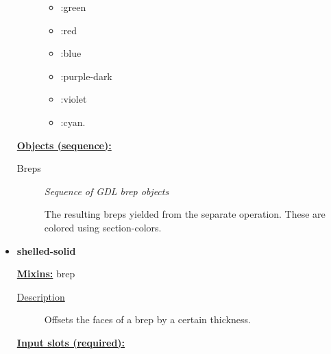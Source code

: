 \documentclass [11pt]{book}
\begin{document}
\begin{itemize}
\begin{description}
\begin{itemize}
\item  :green 

\item  :red 

\item  :blue 

\item  :purple-dark 

\item  :violet 

\item  :cyan. 

\end{itemize}





\end{description}






\textbf{
\underline{Objects (sequence):}}

\begin{description}

\item [Breps]
\emph{Sequence of GDL brep objects}

 The resulting breps yielded from the separate operation. These are colored using section-colors.




\end{description}







\item {}
\label{prim:shelled-solid}
\textbf{shelled-solid}


\textbf{
\underline{Mixins:}} brep





\begin{description}

\item [
\underline{Description}]


Offsets the faces of a brep by a certain thickness.



\end{description}








\textbf{
\underline{Input slots (required):}}


\end{itemize}
\end{document}
